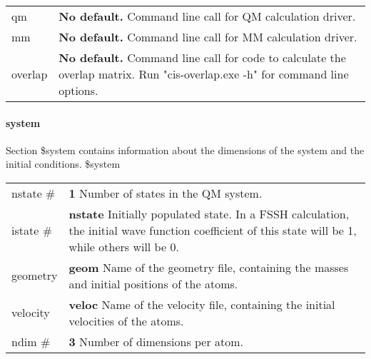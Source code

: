 \documentclass{report}
\begin{document}
\begin{tabularx}{\textwidth}{ m{2.5cm} X }
qm				&
	\textbf{No default.} \newline
	Command line call for QM calculation driver.  \\

mm				&
	\textbf{No default.} \newline
	Command line call for MM calculation driver.  \\

overlap				&
    	\textbf{No default.} \newline
	Command line call for code to calculate the overlap matrix. Run "cis-overlap.exe -h" for command line options.
\end{tabularx}

\paragraph{system}
Section \$system contains information about the dimensions of the system and the initial conditions. \newline
\$system

\begin{tabularx}{\textwidth}{ m{2.5cm} X }
nstate \#		&
\textbf{1} \newline
Number of states in the QM system.  \\

istate \#		&
\textbf{nstate} \newline
Initially populated state. In a FSSH calculation, the initial wave function coefficient of this state will be 1, while others will be 0.  \\

geometry 		&
\textbf{geom} \newline
Name of the geometry file, containing the masses and initial positions of the atoms.  \\

velocity		&
\textbf{veloc} \newline
Name of the velocity file, containing the initial velocities of the atoms.  \\

ndim \#		&
\textbf{3} \newline
Number of dimensions per atom.  \\	
\end{tabularx}
\end{document}
